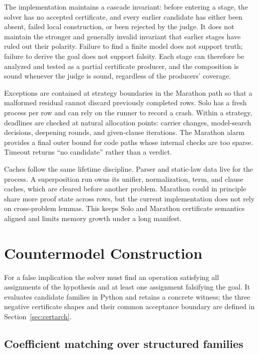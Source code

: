 \documentclass[10pt,twocolumn]{article}
\begin{document}
The implementation maintains a cascade invariant: before entering a stage,
the solver has no accepted certificate, and every earlier candidate has either
been absent, failed local construction, or been rejected by the judge.  It does
not maintain the stronger and generally invalid invariant that earlier stages
have ruled out their polarity.  Failure to find a finite model does not support
truth; failure to derive the goal does not support falsity.  Each stage can
therefore be analyzed and tested as a partial certificate producer, and the
composition is sound whenever the judge is sound, regardless of the producers'
coverage.

Exceptions are contained at strategy boundaries in the Marathon path so that a
malformed residual cannot discard previously completed rows.  Solo has a fresh
process per row and can rely on the runner to record a crash.  Within a
strategy, deadlines are checked at natural allocation points: carrier changes,
model-search decisions, deepening rounds, and given-clause iterations.  The
Marathon alarm provides a final outer bound for code paths whose internal
checks are too sparse.  Timeout returns ``no candidate'' rather than a verdict.

Caches follow the same lifetime discipline.  Parser and static-law data live
for the process.  A superposition run owns its unifier, normalization, term,
and clause caches, which are cleared before another problem.  Marathon could
in principle share more proof state across rows, but the current implementation
does not rely on cross-problem lemmas.  This keeps Solo and Marathon certificate
semantics aligned and limits memory growth under a long manifest.

\section{Countermodel Construction}
\label{sec:false}

For a false implication the solver must find an operation satisfying all
assignments of the hypothesis and at least one assignment falsifying the
goal.  It evaluates candidate families in Python and retains a concrete
witness; the three negative certificate shapes and their common acceptance
boundary are defined in Section~\ref{sec:certarch}.

\subsection{Coefficient matching over structured families}
\end{document}
